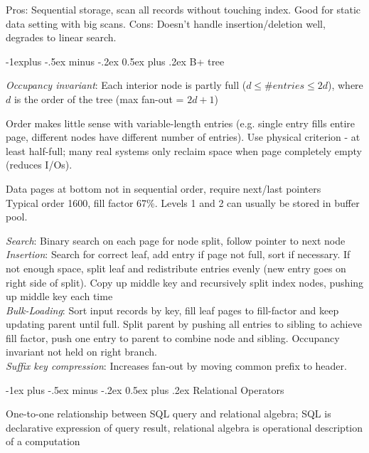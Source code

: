 \documentclass[10pt,landscape]{article}
\makeatletter
\renewcommand{\section}{\@startsection{section}{1}{0mm}%
                                {-1ex plus -.5ex minus -.2ex}%
                                {0.5ex plus .2ex}%
                                {\normalfont\large\bfseries}}
\renewcommand{\subsection}{\@startsection{subsection}{2}{0mm}%
                                {-1explus -.5ex minus -.2ex}%
                                {0.5ex plus .2ex}%
                                {\normalfont\normalsize\bfseries}}
\makeatother
\begin{document}
\begin{multicols}{3}
Pros: Sequential storage, scan all records without touching index. Good for static data setting with big scans. Cons: Doesn't handle insertion/deletion well, degrades to linear search.

\subsection{B+ tree}

\textit{Occupancy invariant}: Each interior node is partly full ($d \le \# entries \le 2d$), where $d$ is the order of the tree (max fan-out = $2d + 1$)

Order makes little sense with variable-length entries (e.g. single entry fills entire page, different nodes have different number of entries). Use physical criterion - at least half-full; many real systems only reclaim space when page completely empty (reduces I/Os).

Data pages at bottom not in sequential order, require next/last pointers \\
Typical order 1600, fill factor 67\%. Levels 1 and 2 can usually be stored in buffer pool.

\textit{Search}: Binary search on each page for node split, follow pointer to next node \\
\textit{Insertion}: Search for correct leaf, add entry if page not full, sort if necessary. If not enough space, split leaf and redistribute entries evenly (new entry goes on right side of split). Copy up middle key and recursively split index nodes, pushing up middle key each time \\
\textit{Bulk-Loading}: Sort input records by key, fill leaf pages to fill-factor and keep updating parent until full. Split parent by pushing all entries to sibling to achieve fill factor, push one entry to parent to combine node and sibling. Occupancy invariant not held on right branch. \\
\textit{Suffix key compression}: Increases fan-out by moving common prefix to header.


\section{Relational Operators}

One-to-one relationship between SQL query and relational algebra; SQL is declarative expression of query result, relational algebra is operational description of a computation


\end{multicols}
\end{document}
